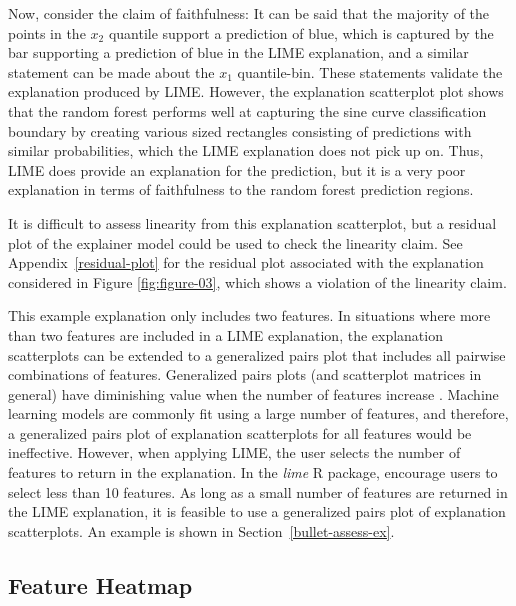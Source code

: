 \documentclass[AMS,STIX2COL]{WileyNJD-v2}\usepackage[]{graphicx}\usepackage[]{color}
\begin{document}
Now, consider the claim of faithfulness: It can be said that the majority of the points in the $x_2$ quantile support a prediction of blue, which is captured by the bar supporting a prediction of blue in the LIME explanation, and a similar statement can be made about the $x_1$ quantile-bin. These statements validate the explanation produced by LIME. However, the explanation scatterplot plot shows that the random forest performs well at capturing the sine curve classification boundary by creating various sized rectangles consisting of predictions with similar probabilities, which the LIME explanation does not pick up on. Thus, LIME does provide an explanation for the prediction, but it is a very poor explanation in terms of faithfulness to the random forest prediction regions.

It is difficult to assess linearity from this explanation scatterplot, but a residual plot of the explainer model could be used to check the linearity claim. See Appendix~\ref{residual-plot} for the residual plot associated with the explanation considered in Figure \ref{fig:figure-03}, which shows a violation of the linearity claim.

This example explanation only includes two features. In situations where more than two features are included in a LIME explanation, the explanation scatterplots can be extended to a generalized pairs plot \citep{emerson:2013} that includes all pairwise combinations of features. Generalized pairs plots (and scatterplot matrices in general) have diminishing value when the number of features increase \citep{jensen:2011} \citep{sweller:2011}. Machine learning models are commonly fit using a large number of features, and therefore, a generalized pairs plot of explanation scatterplots for all features would be ineffective. However, when applying LIME, the user selects the number of features to return in the explanation. In the \emph{lime} R package, \citet{pedersen:2020} encourage users to select less than 10 features. As long as a small number of features are returned in the LIME explanation,  it is feasible to use a generalized pairs plot of explanation scatterplots. An example is shown in Section~\ref{bullet-assess-ex}.

\subsection{Feature Heatmap} \label{feat-heat}
\end{document}
